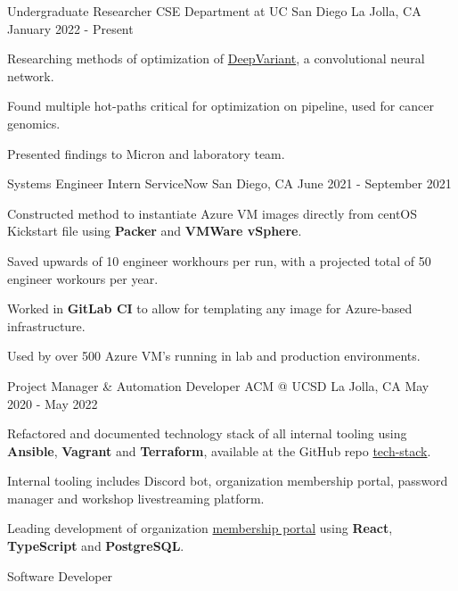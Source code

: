 \begin{cventries}
  \cventry
    {Undergraduate Researcher}
    {CSE Department at UC San Diego}
    {La Jolla, CA}
    {January 2022 - Present}
    {
      \begin{cvitems}
        \item {Researching methods of optimization of \href{https://github.com/google/deepvariant}{DeepVariant}, a convolutional neural network.}
        \item {Found multiple hot-paths critical for optimization on pipeline, used for cancer genomics.}
        \item {Presented findings to Micron and laboratory team.}
      \end{cvitems}
    }
  \cventry
    {Systems Engineer Intern}
    {ServiceNow}
    {San Diego, CA}
    {June 2021 - September 2021}
    {
      \begin{cvitems}
        \item {Constructed method to instantiate Azure VM images directly from centOS Kickstart file using \textbf{Packer} and \textbf{VMWare vSphere}.}
        \item {Saved upwards of 10 engineer workhours per run, with a projected total of 50 engineer workours per year.}
        \item {Worked in \textbf{GitLab CI} to allow for templating any image for Azure-based infrastructure.}
        \item {Used by over 500 Azure VM's running in lab and production environments.}
      \end{cvitems}
    }
  \cventry
  {Project Manager \& Automation Developer}
  {ACM @ UCSD}
  {La Jolla, CA}
  {May 2020 - May 2022}
  {
    \begin{cvitems}
      \item {Refactored and documented technology stack of all internal tooling using \textbf{Ansible}, \textbf{Vagrant} and \textbf{Terraform}, available at the GitHub repo \href{https://github.com/acmucsd/tech-stack}{tech-stack}.}
      \item {Internal tooling includes Discord bot, organization membership portal, password manager and workshop livestreaming platform.}
      \item {Leading development of organization \href{https://github.com/acmucsd/membership-portal-ui}{membership portal} using \textbf{React}, \textbf{TypeScript} and \textbf{PostgreSQL}.}
    \end{cvitems}
  }
  \cventry
    {Software Developer}

\end{cventries}

